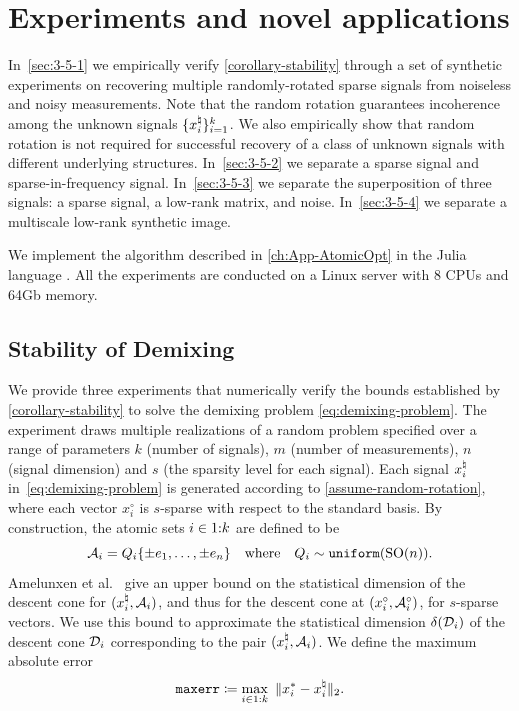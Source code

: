\section{Experiments and novel applications} \label{sec:3-5}

In~\autoref{sec:3-5-1} we empirically verify \autoref{corollary-stability} through a set of synthetic experiments on recovering multiple randomly-rotated sparse signals from noiseless and noisy measurements. Note that the random rotation guarantees incoherence among the unknown signals $\{x_i^{\natural}\}_{i=1}^k$. We also empirically show that random rotation is not required for successful recovery of a class of unknown signals with different underlying structures. In~\autoref{sec:3-5-2} we separate a sparse signal and sparse-in-frequency signal. In~\autoref{sec:3-5-3} we separate the superposition of three signals: a sparse signal, a low-rank matrix, and noise. In~\autoref{sec:3-5-4} we separate a multiscale low-rank synthetic image.

We implement the algorithm described in \autoref{ch:App-AtomicOpt} in the Julia language \cite{BEKS14}. All the experiments are conducted on a Linux server with 8 CPUs and 64Gb memory.

\subsection{Stability of Demixing} \label{sec:3-5-1}

We provide three experiments that numerically verify the bounds established by \autoref{corollary-stability} to solve the demixing problem \eqref{eq:demixing-problem}. The experiment draws multiple realizations of a random problem specified over a range of parameters $k$ (number of signals), $m$ (number of measurements), $n$ (signal dimension) and $s$ (the sparsity level for each signal). Each signal $x_i^{\natural}$ in~\eqref{eq:demixing-problem} is generated according to \autoref{assume-random-rotation}, where each vector $x_i^\circ$ is $s$-sparse with respect to the standard basis. By construction, the atomic sets $i\in1\mathord{:}k$ are defined to be 
\[
  \mathcal{A}_i = Q_i \{\pm e_1, \dots, \pm e_n\}\hbox{\quad where\quad} Q_i\sim\operatorname{\texttt{uniform}}(\operatorname{SO}(n)).
\]
Amelunxen et al.~\cite[Proposition~4.5]{amelunxen2014living} give an upper bound on the statistical dimension of the descent cone for $(x_i^{\natural},\mathcal{A}_i)$, and thus for the descent cone at $(x_i^\circ,\mathcal{A}_i^\circ)$, for  $s$-sparse vectors. We use this bound to approximate the statistical dimension $\delta(\mathcal{D}_i)$ of the descent cone $\mathcal{D}_i$ corresponding to the pair $(x_i^{\natural},\mathcal{A}_i)$.  We define the maximum absolute error
\begin{equation} \label{eq:rela_diff}
  \mathop{\tt maxerr}\coloneqq \max_{i\in\irange1k}\ \twonorm{x_i^*-x\nai}.
\end{equation}

